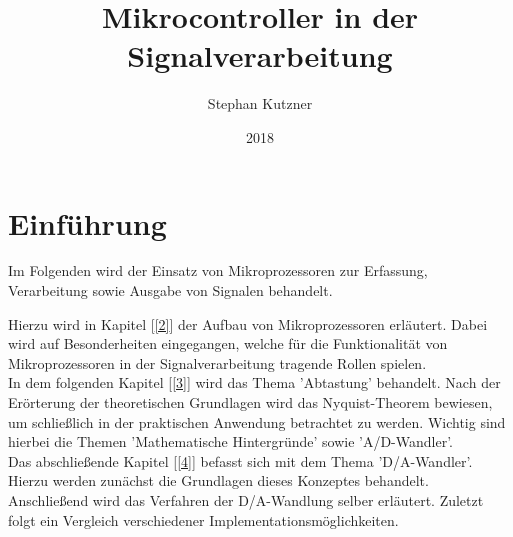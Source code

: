 \documentclass[a4paper,12pt]{article}
\title{Mikrocontroller in der Signalverarbeitung}
\date{2018}
\author{Stephan Kutzner}
\theoremstyle{plain}
\begin{document}

\tableofcontents
\newpage
\section{Einführung}
Im Folgenden wird der Einsatz von Mikroprozessoren zur Erfassung, Verarbeitung sowie Ausgabe von Signalen behandelt.

Hierzu wird in Kapitel [\ref{2}] der Aufbau von Mikroprozessoren erläutert. Dabei wird auf Besonderheiten eingegangen, welche für die Funktionalität von Mikroprozessoren in der Signalverarbeitung tragende Rollen spielen.\\
In dem folgenden Kapitel [\ref{3}] wird das Thema 'Abtastung' behandelt. Nach der Erörterung der theoretischen Grundlagen wird das Nyquist-Theorem bewiesen, um schließlich in der praktischen Anwendung betrachtet zu werden. Wichtig sind hierbei die Themen 'Mathematische Hintergründe' sowie 'A/D-Wandler'.\\
Das abschließende Kapitel [\ref{4}] befasst sich mit dem Thema 'D/A-Wandler'. Hierzu werden zunächst die Grundlagen dieses Konzeptes behandelt. Anschließend wird das Verfahren der D/A-Wandlung selber erläutert. Zuletzt folgt ein Vergleich verschiedener Implementationsmöglichkeiten.\\

\newpage




\newpage


\end{document}
